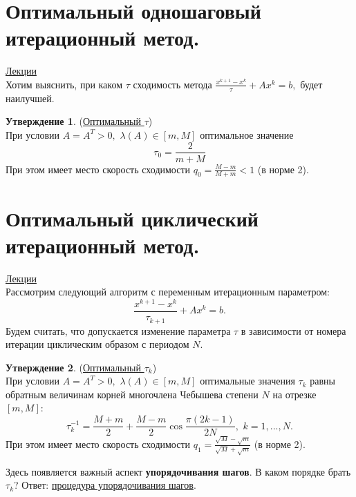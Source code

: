 \documentclass[specialist, subf, href, colorlinks=true, 12pt, times, mtpro, final]{disser}
\theoremstyle{definition}
\newtheorem{state}{Утверждение}[section]
\begin{document}
{\section {Оптимальный одношаговый итерационный метод.}
    \hyperlink {lects.60}{Лекции}\\
    Хотим выяснить, при каком $\tau$ сходимость метода
    $\frac{x^{k+1} - x^{k}}{\tau} + Ax^{k} = b,$ будет наилучшей.
    \begin{state} (\hyperlink {lects.60}{Оптимальный $\tau$})\\
    При условии $A = A^T > 0, \,\, \lambda(A) \in [m, M]$ оптимальное значение
    $$\tau_0 = \frac{2}{m+M}$$
    При этом имеет место скорость сходимости $q_0 = \frac{M-m}{M+m} < 1$ (в норме 2).
    \end{state}

\section {Оптимальный циклический итерационный метод.}
    \hyperlink {lects.61}{Лекции}\\
    Рассмотрим следующий алгоритм с переменным итерационным параметром:
    $$
        \frac{x^{k+1} - x^{k}}{\tau_{k+1}} + Ax^{k} = b.
    $$
    Будем считать, что допускается изменение параметра $\tau$ в зависимости от номера итерации циклическим образом с периодом $N$.
    \begin{state} (\hyperlink {lects.61}{Оптимальный $\tau_{k}$})\\
    При условии $A = A^T > 0, \,\, \lambda(A) \in [m, M]$ оптимальные значения $\tau_k$
    равны обратным величинам корней многочлена Чебышева степени $N$ на отрезке $[m, M]$:
    $$
    \tau_k^{-1} = \frac{M+m}{2} + \frac{M-m}{2}\cos\frac{\pi(2k-1)}{2N}, \,\, k = 1,...,N.
    $$
    При этом имеет место скорость сходимости
    $q_1 = \frac{\sqrt{M}-\sqrt{m}}{\sqrt{M}+\sqrt{m}}$ (в норме 2).
    \end{state}
    Здесь появляется важный аспект {\bf упорядочивания шагов}. В каком порядке брать $\tau_k$?
    Ответ: \hyperlink {lects.62}{процедура упорядочивания шагов}.

}
\end{document}
